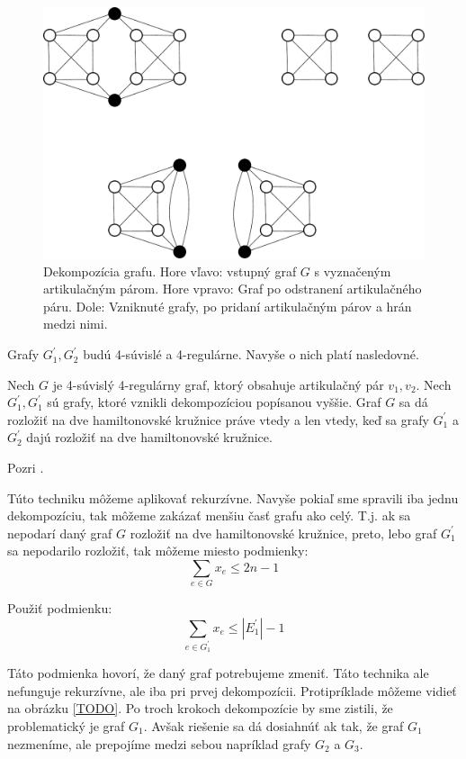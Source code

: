 \begin{figure}
\centering
\includegraphics[width=15cm]{img/decomp.pdf}
\caption{Dekompozícia grafu. Hore vľavo: vstupný graf $G$ s vyznačeným artikulačným párom. Hore
vpravo: Graf po odstranení artikulačného páru. Dole: Vzniknuté grafy, po pridaní artikulačným párov
a hrán medzi nimi.}
\end{figure}

Grafy $G_1^{'}, G_2^{'}$ budú 4-súvislé a 4-regulárne. Navyše o nich platí nasledovné.

\begin{veta}
Nech $G$ je 4-súvislý 4-regulárny graf, ktorý obsahuje artikulačný pár $v_1, v_2$.
Nech $G_1^{'}, G_1^{'}$ sú grafy, ktoré vznikli dekompozíciou popísanou vyššie.
Graf $G$ sa dá rozložiť na dve hamiltonovské kružnice práve vtedy a len vtedy, keď
sa grafy $G_1^{'}$ a $G_2^{'}$ dajú rozložiť na dve hamiltonovské kružnice.
\end{veta}

\begin{dokaz}
Pozri \cite{duchenne}.
\end{dokaz}

Túto techniku môžeme aplikovať rekurzívne. Navyše pokiaľ sme spravili iba jednu dekompozíciu, tak
môžeme zakázať menšiu časť grafu ako celý. T.j. ak sa nepodarí daný graf $G$ rozložiť na dve
hamiltonovské kružnice, preto, lebo graf $G_1^{'}$ sa nepodarilo rozložiť, tak môžeme miesto podmienky:
$$\sum_{e \in G} x_e \leq 2n - 1$$

Použiť podmienku:
$$\sum_{e \in G_1^{'}} x_e \leq |E_1^{'}| - 1$$

Táto podmienka hovorí, že daný graf potrebujeme zmeniť.
Táto technika ale nefunguje rekurzívne, ale iba pri prvej dekompozícii. Protipríklade môžeme vidieť
na obrázku \ref{TODO}. Po troch krokoch dekompozície by sme zistili, že problematický je graf $G_1$.
Avšak riešenie sa dá dosiahnúť ak tak, že graf $G_1$ nezmeníme, ale prepojíme medzi sebou napríklad
grafy $G_2$ a $G_3$.


